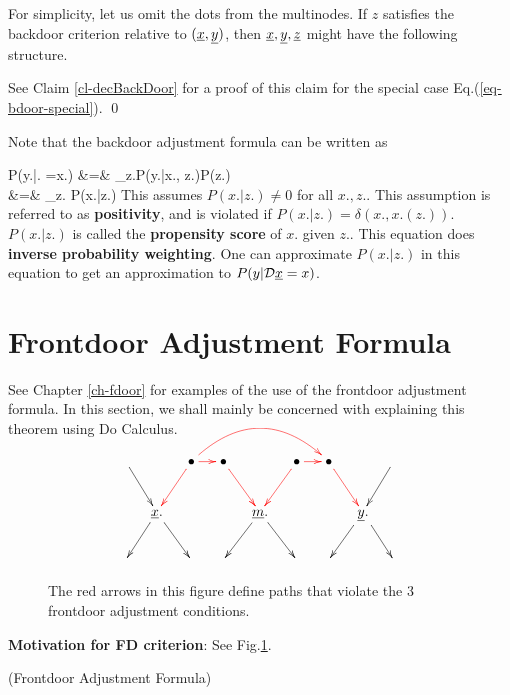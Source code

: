 For simplicity,
let us omit
the dots from the
multinodes.
If
$z$
satisfies the
backdoor
criterion
relative
to
$(\rvx, \rvy)$,
then
$\rvx, \rvy, \rvz$
might
have the following
structure.


\beq
{}
\label{eq-bdoor-special}
\eeq

See Claim \ref{cl-decBackDoor}
for a proof of this claim
for the
special case Eq.(\ref{eq-bdoor-special}).
\qed

Note that the backdoor adjustment  formula
can be written as

\beqa
P(y.|\cald \rvx. =x.)
&=&
\sum_{z.}P(y.|x., z.)P(z.)
\\
&=&
\sum_{z.}
{P(x.|z.)}
\eeqa
This assumes $P(x.|z.)\neq 0$
for all $x., z.$. This assumption
is referred to
as {\bf positivity},
and is violated
if $P(x.|z.)=\delta(x., x.(z.))$.
$P(x.|z.)$ is called the
{\bf propensity score}
of $x.$ given $z.$.
This
equation does
{\bf inverse probability weighting}.
One
can approximate $P(x.|z.)$
in this equation
to get
an approximation
to  $P(y|\cald\rvx=x)$.


\section{Frontdoor Adjustment Formula}
See Chapter \ref{ch-fdoor}
for examples of the use of the
frontdoor adjustment formula.
In this section,
we shall mainly be
concerned with
explaining this
theorem
using Do Calculus.

\fdoordef

\begin{figure}[h!]
$$
\xymatrix@C=1pc{
\ar[dr]
&&\bullet\ar@[red][dl]\ar@/^2pc/@[red][rrrr]\ar@[red][r]
&\bullet\ar@[red][dr]
&&\bullet\ar@[red][dl]\ar@[red][r]
&\bullet\ar@[red][dr]
&&\ar[dl]
\\
&\rvx.
\ar[dl]
\ar[dr]
&&&\rvm.
\ar[dl]
\ar[dr]
&&&{\rvy.}
\ar[dl]
\ar[dr]
\\
&&&&&&&&
}
$$
\caption{The red arrows in this figure define paths 
that violate the 3 frontdoor adjustment conditions.}
 \label{fig-fdoor-red-paths}
\end{figure}
{\bf Motivation for FD criterion}:
See Fig.\ref{fig-fdoor-red-paths}.


\begin{claim} (Frontdoor Adjustment
Formula)

\fdoorclaim

\end{claim}
\proof


